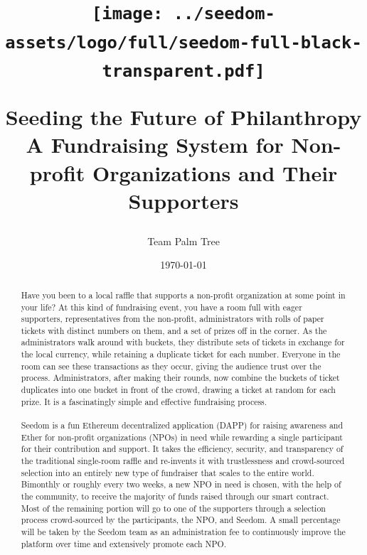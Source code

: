 \documentclass[11pt]{article}
\begin{document}
\title{%
\begin{center}
\texttt{[image: ../seedom-assets/logo/full/seedom-full-black-transparent.pdf]}
\end{center}
\large Seeding the Future of Philanthropy \\[1mm]
\large A Fundraising System for Non-profit Organizations and Their Supporters \\[1mm]}
\author{Team Palm Tree}
\date{\today}
\maketitle

\begin{abstract}

Have you been to a local raffle that supports a non-profit organization at some point in your life? At this kind of fundraising event, you have a room full with eager supporters, representatives from the non-profit, administrators with rolls of paper tickets with distinct numbers on them, and a set of prizes off in the corner. As the administrators walk around with buckets, they distribute sets of tickets in exchange for the local currency, while retaining a duplicate ticket for each number. Everyone in the room can see these transactions as they occur, giving the audience trust over the process. Administrators, after making their rounds, now combine the buckets of ticket duplicates into one bucket in front of the crowd, drawing a ticket at random for each prize. It is a fascinatingly simple and effective fundraising process.\\\\
Seedom is a fun Ethereum decentralized application (DAPP) for raising awareness and Ether for non-profit organizations (NPOs) in need while rewarding a single participant for their contribution and support. It takes the efficiency, security, and transparency of the traditional single-room raffle and re-invents it with trustlessness and crowd-sourced selection into an entirely new type of fundraiser that scales to the entire world. Bimonthly or roughly every two weeks, a new NPO in need is chosen, with the help of the community, to receive the majority of funds raised through our smart contract. Most of the remaining portion will go to one of the supporters through a selection process crowd-sourced by the participants, the NPO, and Seedom. A small percentage will be taken by the Seedom team as an administration fee to continuously improve the platform over time and extensively promote each NPO.

\end{abstract}
\pagebreak
\end{document}
